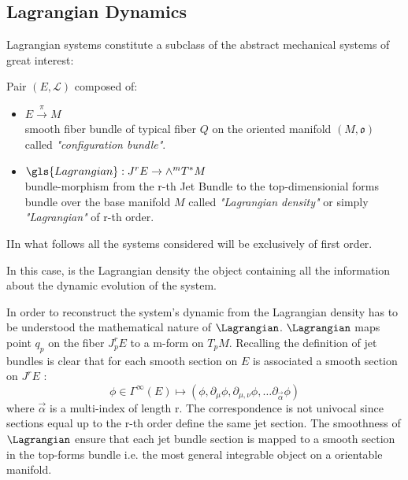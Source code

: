 \documentclass[Main]{subfiles}
\begin{document}
	\subsection{Lagrangian Dynamics}	
	Lagrangian systems constitute a subclass of the abstract mechanical systems of great interest:
		\begin{definition}
	Pair $(E, \mathcal{L} )$ composed of:
		\begin{itemize}
			\item $E \xrightarrow{\pi} M$ \\smooth fiber bundle of typical fiber $Q$ on the oriented manifold $(M,\mathfrak{o})$ called \emph{"configuration bundle"}.
			\item	$ \gls{Lagrangian} : J^r E \rightarrow \wedge^m T^*M$ \\bundle-morphism from the r-th Jet Bundle to  the top-dimensionial forms bundle over the base manifold $M$  called \emph{"Lagrangian density"} or simply \emph{"Lagrangian"} of r-th order.
		\end{itemize}
	\end{definition}	
	
	\begin{NB}
		IIn what follows all the systems considered will be exclusively of first order.
	\end{NB}	
	
	
	In this case, is the Lagrangian density the object containing all the information about the dynamic evolution of the system.

	In order to reconstruct the system's dynamic from the Lagrangian density has to be understood the mathematical nature of $\Lagrangian$.
	$\Lagrangian$ maps point $q_p$ on the fiber $J^r_p E$ to a m-form on $T_p M$.
	Recalling the definition of jet bundles is clear that for each smooth section on $E$ is associated a smooth section on $J^rE$ :
	\begin{displaymath}
		\phi \in \Gamma^\infty (E) \mapsto (\phi, \partial_\mu \phi, \partial_{\mu, \nu} \phi , \ldots \partial_{\vec{\alpha}}\phi)
	\end{displaymath}
	where  $\vec{\alpha}$ is a multi-index of length r.
	The correspondence is not univocal since sections equal up to the r-th order define the same jet section.
	The smoothness of $\Lagrangian$ ensure that each jet bundle section is mapped to a smooth section in the top-forms bundle i.e. the most general integrable object on a orientable manifold.
	
\end{document}
